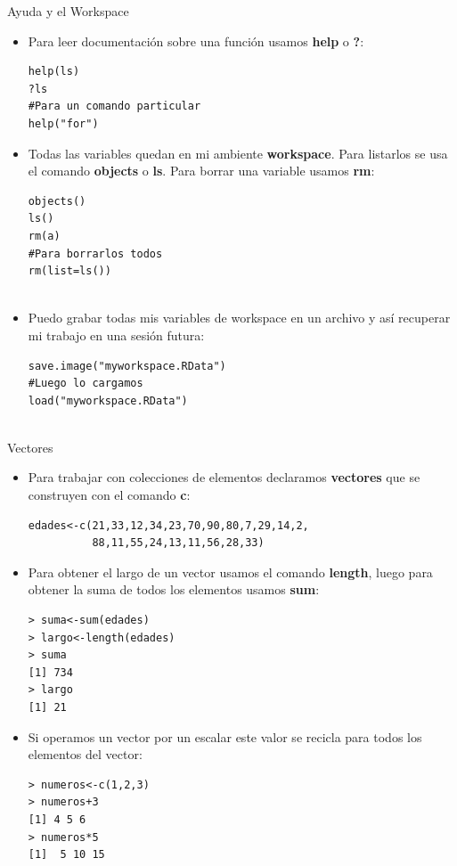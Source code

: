 \documentclass[handout]{beamer}
\begin{document}
\begin{frame}[fragile]{Ayuda y el Workspace}
\scriptsize{
\begin{itemize}
 \item Para leer documentación sobre una función usamos \textbf{help} o \textbf{?}:
\begin{verbatim}
help(ls)
?ls
#Para un comando particular
help("for")

\end{verbatim}

\item Todas las variables quedan en mi ambiente \textbf{workspace}. Para listarlos se usa el comando \textbf{objects} o \textbf{ls}. Para borrar una variable usamos \textbf{rm}:

\begin{verbatim}
objects()
ls()
rm(a)
#Para borrarlos todos
rm(list=ls())
 
\end{verbatim}


\item Puedo grabar todas mis variables de workspace en un archivo y así recuperar mi trabajo en una sesión futura:
\begin{verbatim}
save.image("myworkspace.RData")
#Luego lo cargamos
load("myworkspace.RData")
 
\end{verbatim}


 
 
 
 \end{itemize}



}
 
 
\end{frame}

\begin{frame}[fragile]{Vectores}
\scriptsize{
\begin{itemize}
 \item Para trabajar con colecciones de elementos declaramos \textbf{vectores} que se construyen con el comando \textbf{c}:
 \begin{verbatim}
edades<-c(21,33,12,34,23,70,90,80,7,29,14,2,
          88,11,55,24,13,11,56,28,33)
 \end{verbatim}
 \item Para obtener el largo de un vector usamos el comando \textbf{length}, luego para obtener la suma de todos los elementos usamos \textbf{sum}:
 \begin{verbatim}
> suma<-sum(edades)
> largo<-length(edades)
> suma
[1] 734
> largo
[1] 21
 \end{verbatim}
 
\item Si operamos un vector por un escalar este valor se recicla para todos los elementos del vector:
 \begin{verbatim}
> numeros<-c(1,2,3)
> numeros+3
[1] 4 5 6
> numeros*5
[1]  5 10 15
 \end{verbatim}
\end{itemize}




}
 
 
\end{frame}
\end{document}
